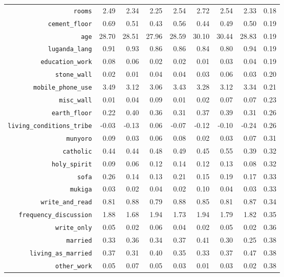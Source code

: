 \begin{longtable}{rrrrrrrrr}
  {\texttt{rooms}} & 2.49 & 2.34 & 2.25 & 2.54 & 2.72 & 2.54 & 2.33 & 0.18 \\ 
  {\texttt{cement\_floor}} & 0.69 & 0.51 & 0.43 & 0.56 & 0.44 & 0.49 & 0.50 & 0.19 \\ 
  {\texttt{age}} & 28.70 & 28.51 & 27.96 & 28.59 & 30.10 & 30.44 & 28.83 & 0.19 \\ 
  {\texttt{luganda\_lang}} & 0.91 & 0.93 & 0.86 & 0.86 & 0.84 & 0.80 & 0.94 & 0.19 \\ 
  {\texttt{education\_work}} & 0.08 & 0.06 & 0.02 & 0.02 & 0.01 & 0.03 & 0.04 & 0.19 \\ 
  {\texttt{stone\_wall}} & 0.02 & 0.01 & 0.04 & 0.04 & 0.03 & 0.06 & 0.03 & 0.20 \\ 
  {\texttt{mobile\_phone\_use}} & 3.49 & 3.12 & 3.06 & 3.43 & 3.28 & 3.12 & 3.34 & 0.21 \\ 
  {\texttt{misc\_wall}} & 0.01 & 0.04 & 0.09 & 0.01 & 0.02 & 0.07 & 0.07 & 0.23 \\ 
  {\texttt{earth\_floor}} & 0.22 & 0.40 & 0.36 & 0.31 & 0.37 & 0.39 & 0.31 & 0.26 \\ 
  {\texttt{living\_conditions\_tribe}} & -0.03 & -0.13 & 0.06 & -0.07 & -0.12 & -0.10 & -0.24 & 0.26 \\ 
  {\texttt{munyoro}} & 0.09 & 0.03 & 0.06 & 0.08 & 0.02 & 0.03 & 0.07 & 0.31 \\ 
  {\texttt{catholic}} & 0.44 & 0.44 & 0.48 & 0.49 & 0.45 & 0.55 & 0.39 & 0.32 \\ 
  {\texttt{holy\_spirit}} & 0.09 & 0.06 & 0.12 & 0.14 & 0.12 & 0.13 & 0.08 & 0.32 \\ 
  {\texttt{sofa}} & 0.26 & 0.14 & 0.13 & 0.21 & 0.15 & 0.19 & 0.17 & 0.33 \\ 
  {\texttt{mukiga}} & 0.03 & 0.02 & 0.04 & 0.02 & 0.10 & 0.04 & 0.03 & 0.33 \\ 
  {\texttt{write\_and\_read}} & 0.81 & 0.88 & 0.79 & 0.88 & 0.85 & 0.81 & 0.87 & 0.34 \\ 
  {\texttt{frequency\_discussion}} & 1.88 & 1.68 & 1.94 & 1.73 & 1.94 & 1.79 & 1.82 & 0.35 \\ 
  {\texttt{write\_only}} & 0.05 & 0.02 & 0.06 & 0.04 & 0.02 & 0.05 & 0.02 & 0.36 \\ 
  {\texttt{married}} & 0.33 & 0.36 & 0.34 & 0.37 & 0.41 & 0.30 & 0.25 & 0.38 \\ 
  {\texttt{living\_as\_married}} & 0.37 & 0.31 & 0.40 & 0.35 & 0.33 & 0.37 & 0.47 & 0.38 \\ 
  {\texttt{other\_work}} & 0.05 & 0.07 & 0.05 & 0.03 & 0.01 & 0.03 & 0.02 & 0.38 \\ 

\end{longtable}
